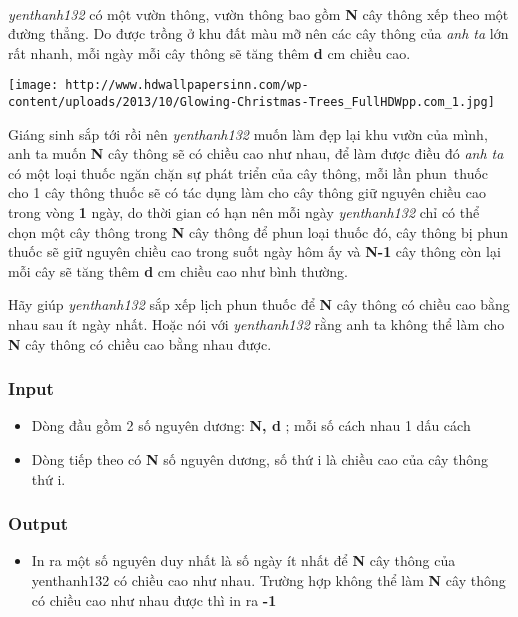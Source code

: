 

 

\emph{yenthanh132 } có một vườn thông, vườn thông bao gồm \textbf{ N } cây thông xếp theo một đường thẳng. Do được trồng ở khu đất màu mỡ nên các cây thông của \emph{ anh ta }\emph{} lớn rất nhanh, mỗi ngày mỗi cây thông sẽ tăng thêm \textbf{ d } cm chiều cao.


\texttt{[image: http://www.hdwallpapersinn.com/wp-content/uploads/2013/10/Glowing-Christmas-Trees\_FullHDWpp.com\_1.jpg]}

Giáng sinh sắp tới rồi nên \emph{ yenthanh132 } muốn làm đẹp lại khu vườn của mình, anh ta muốn \textbf{ N } cây thông sẽ có chiều cao như nhau, để làm được điều đó \emph{ anh ta } có một loại thuốc ngăn chặn sự phát triển của cây thông, mỗi lần phun thuốc cho 1 cây thông thuốc sẽ có tác dụng làm cho cây thông giữ nguyên chiều cao trong vòng \textbf{ 1 } ngày, do thời gian có hạn nên mỗi ngày \emph{ yenthanh132 } chỉ có thể chọn một cây thông trong \textbf{ N } cây thông để phun loại thuốc đó, cây thông bị phun thuốc sẽ giữ nguyên chiều cao trong suốt ngày hôm ấy và \textbf{ N-1 } cây thông còn lại mỗi cây sẽ tăng thêm \textbf{ d } cm chiều cao như bình thường.

Hãy giúp \emph{ yenthanh132 } sắp xếp lịch phun thuốc để \textbf{ N } cây thông có chiều cao bằng nhau sau ít ngày nhất. Hoặc nói với \emph{ yenthanh132 } rằng anh ta không thể làm cho \textbf{ N } cây thông có chiều cao bằng nhau được.

\subsubsection{Input}
\begin{itemize}
	\item Dòng đầu gồm 2 số nguyên dương: \textbf{ N, d } ; mỗi số cách nhau 1 dấu cách
	\item Dòng tiếp theo có \textbf{ N } số nguyên dương, số thứ i là chiều cao của cây thông thứ i.
\end{itemize}

\subsubsection{Output}
\begin{itemize}
	\item In ra một số nguyên duy nhất là số ngày ít nhất để \textbf{ N } cây thông của yenthanh132 có chiều cao như nhau. Trường hợp không thể làm \textbf{ N } cây thông có chiều cao như nhau được thì in ra \textbf{ -1 }
\end{itemize}

